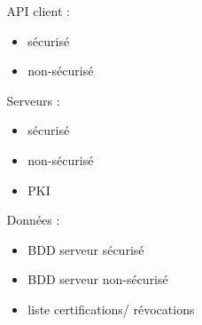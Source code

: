 \documentclass{beamer}
\begin{document}
{\begin{columns}
\begin{column}{.5\linewidth}
\begin{center}
  	  \end{center}
    \end{column}
    \begin{column}{.5\linewidth}
      API client :
      \begin{itemize}
      	\item sécurisé
      	\item non-sécurisé
      \end{itemize}
      
      Serveurs :
      \begin{itemize}
      	\item sécurisé
      	\item non-sécurisé
      	\item PKI
      \end{itemize}
      
      Données :
      \begin{itemize}
      	\item BDD serveur sécurisé
      	\item BDD serveur non-sécurisé
      	\item liste certifications/ révocations
      \end{itemize}
    \end{column}
  \end{columns}
}
\end{document}
